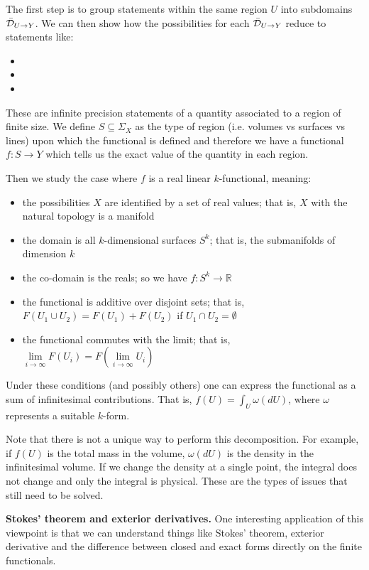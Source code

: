 \documentclass[11pt,letterpaper,fleqn]{memoir} %
\begin{document}
The first step is to group statements within the same region $U$ into subdomains $\bar{\mathcal{D}}_{U\to Y}$. We can then show how the possibilities for each $\bar{\mathcal{D}}_{U\to Y}$ reduce to statements like:
\begin{itemize}
	\item {}
	\item {}
	\item {}
\end{itemize}
These are infinite precision statements of a quantity associated to a region of finite size. We define $S \subseteq \Sigma_X$ as the type of region (i.e. volumes vs surfaces vs lines) upon which the functional is defined and therefore we have a functional $f : S \to Y$ which tells us the exact value of the quantity in each region.

Then we study the case where $f$ is a real linear $k$-functional, meaning:
\begin{itemize}
	\item the possibilities $X$ are identified by a set of real values; that is, $X$ with the natural topology is a manifold
	\item the domain is all $k$-dimensional surfaces $S^k$; that is, the submanifolds of dimension $k$
	\item the co-domain is the reals; so we have $f : S^k \to \mathbb{R}$
	\item the functional is additive over disjoint sets; that is, $F(U_1 \cup U_2) = F(U_1) + F(U_2)$ if $U_1 \cap U_2 = \emptyset$
	\item the functional commutes with the limit; that is, $\lim\limits_{i \to \infty} F(U_i) = F(\lim\limits_{i \to \infty} U_i)$
\end{itemize}
Under these conditions (and possibly others) one can express the functional as a sum of infinitesimal contributions. That is, $f(U) = \int_U \omega(dU)$, where $\omega$ represents a suitable $k$-form.

Note that there is not a unique way to perform this decomposition. For example, if $f(U)$ is the total mass in the volume, $\omega(dU)$ is the density in the infinitesimal volume. If we change the density at a single point, the integral does not change and only the integral is physical. These are the types of issues that still need to be solved.

\textbf{Stokes' theorem and exterior derivatives.} One interesting application of this viewpoint is that we can understand things like Stokes' theorem, exterior derivative and the difference between closed and exact forms directly on the finite functionals.
\end{document}
